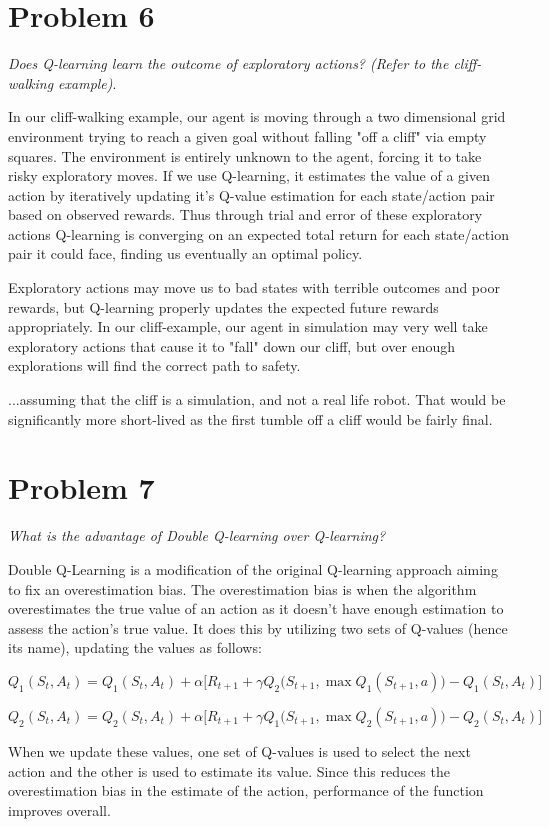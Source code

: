 \documentclass{article}
\begin{document}
\section*{Problem 6}
\textit{Does Q-learning learn the outcome of exploratory actions? (Refer to the cliff-walking example)}.

In our cliff-walking example, our agent is moving through a two dimensional grid environment trying to reach a given goal without falling "off a cliff" via empty squares. The environment is entirely unknown to the agent, forcing it to take risky exploratory moves. If we use Q-learning, it estimates the value of a given action by iteratively updating it's Q-value estimation for each state/action pair based on observed rewards. Thus through trial and error of these exploratory actions Q-learning is converging on an expected total return for each state/action pair it could face, finding us eventually an optimal policy.

Exploratory actions may move us to bad states with terrible outcomes and poor rewards, but Q-learning properly updates the expected future rewards appropriately. In our cliff-example, our agent in simulation may very well take exploratory actions that cause it to "fall" down our cliff, but over enough explorations will find the correct path to safety.

...assuming that the cliff is a simulation, and not a real life robot. That would be significantly more short-lived as the first tumble off a cliff would be fairly final.


\section*{Problem 7}
\textit{What is the advantage of Double Q-learning over Q-learning?}

Double Q-Learning is a modification of the original Q-learning approach aiming to fix an overestimation bias. The overestimation bias is when the algorithm overestimates the true value of an action as it doesn't have enough estimation to assess the action's true value. It does this by utilizing two sets of Q-values (hence its name), updating the values as follows:

\begin{equation}
    Q_1(S_t, A_t) = Q_1(S_t, A_t) + \alpha \biggl[ R_{t+1} + \gamma Q_2 \bigl( S_{t+1}, \max Q_1(S_{t+1}, a) \bigr) - Q_1(S_t, A_t) \biggr]
    \end{equation}
    
\begin{equation}
Q_2(S_t, A_t) = Q_2(S_t, A_t) + \alpha \biggl[ R_{t+1} + \gamma Q_1 \bigl( S_{t+1}, \max Q_2(S_{t+1}, a) \bigr) - Q_2(S_t, A_t) \biggr]
\end{equation}

When we update these values, one set of Q-values is used to select the next action and the other is used to estimate its value. Since this reduces the overestimation bias in the estimate of the action, performance of the function improves overall.
\end{document}
